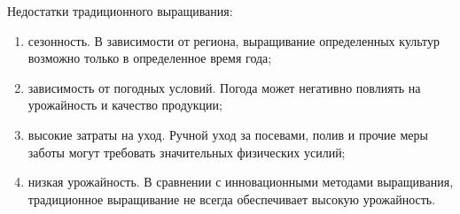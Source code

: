 Недостатки традиционного выращивания:

\begin{enumerate}
    \item сезонность. В зависимости от региона, выращивание определенных культур возможно только в определенное время года;
    \item зависимость от погодных условий. Погода может негативно повлиять на урожайность и качество продукции;
    \item высокие затраты на уход. Ручной уход за посевами, полив и прочие меры заботы могут требовать значительных физических усилий;
    \item низкая урожайность. В сравнении с инновационными методами выращивания, традиционное выращивание не всегда обеспечивает высокую урожайность.
\end{enumerate}

